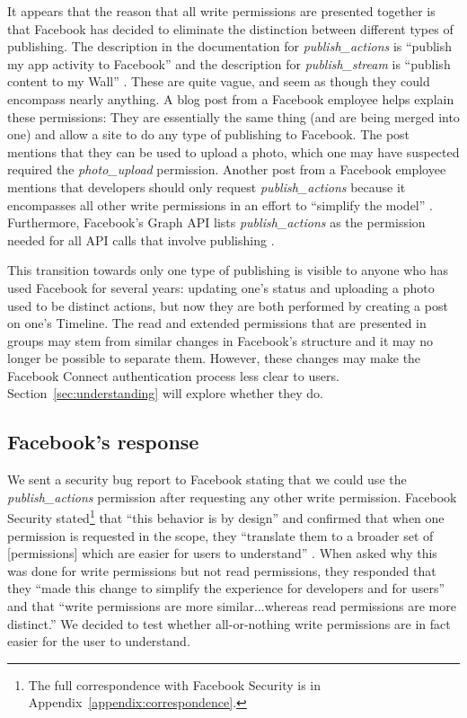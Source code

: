 \documentclass[10pt]{sig-alternate-10pt}
\begin{document}
It appears that the reason that all write permissions are presented together is that Facebook has decided to eliminate the distinction between different types of publishing. The description in the documentation for \emph{publish\_actions} is ``publish my app activity to Facebook'' and the description for \emph{publish\_stream} is ``publish content to my Wall'' \cite{fbpermissions}. These are quite vague, and seem as though they could encompass nearly anything. A blog post from a Facebook employee \cite{publishperms} helps explain these permissions: They are essentially the same thing (and are being merged into one) and allow a site to do any type of publishing to Facebook. The post mentions that they can be used to upload a photo, which one may have suspected required the \emph{photo\_upload} permission. Another post from a Facebook employee mentions that developers should only request \emph{publish\_actions} because it encompasses all other write permissions in an effort to ``simplify the model'' \cite{clarity}. Furthermore, Facebook's Graph API lists \emph{publish\_actions} as the permission needed for all API calls that involve publishing \cite{fbapi}.

This transition towards only one type of publishing is visible to anyone who has used Facebook for several years: updating one's status and uploading a photo used to be distinct actions, but now they are both performed by creating a post on one's Timeline. The read and extended permissions that are presented in groups may stem from similar changes in Facebook's structure and it may no longer be possible to separate them. However, these changes may make the Facebook Connect authentication process less clear to users. Section~\ref{sec:understanding} will explore whether they do.

\subsection{Facebook's response}
\label{sec:fbresponse}

We sent a security bug report to Facebook stating that we could use the \emph{publish\_actions} permission after requesting any other write permission. Facebook Security stated\footnote{The full correspondence with Facebook Security is in Appendix~\ref{appendix:correspondence}.} that ``this behavior is by design'' and confirmed that when one permission is requested in the scope, they ``translate them to a broader set of [permissions] which are easier for users to understand'' \cite{fbsecurity}. When asked why this was done for write permissions but not read permissions, they responded that they ``made this change to simplify the experience for developers and for users'' and that ``write permissions are more similar...whereas read permissions are more distinct.'' We decided to test whether all-or-nothing write permissions are in fact easier for the user to understand.
\end{document}
